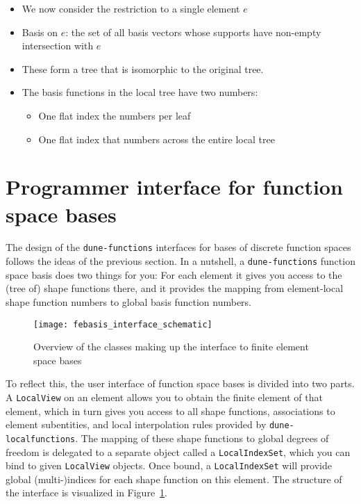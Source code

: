\documentclass[a4paper,10pt,headings=normal,bibliography=totoc]{scrartcl}
\newcommand{\cpp}[1]{\lstinline[basicstyle=\ttfamily]!#1!}
\newcommand{\dunemodule}[1]{\texttt{#1}}
\begin{document}
\begin{itemize}
 \item We now consider the restriction to a single element $e$
 \item Basis on $e$: the set of all basis vectors whose supports have non-empty
   intersection with $e$
 \item These form a tree that is isomorphic to the original tree.
 \item The basis functions in the local tree have two numbers:
   \begin{itemize}
    \item One flat index the numbers per leaf
    \item One flat index that numbers across the entire local tree
   \end{itemize}
\end{itemize}


\section{Programmer interface for function space bases}
\label{sec:dune_functions:function_space_bases_implementation}

The design of the \dunemodule{dune-functions} interfaces for bases of discrete function spaces
follows the ideas of the previous section.  In a nutshell, a \dunemodule{dune-functions} function space basis
does two things for you: For each element it gives you access to the (tree of) shape functions there,
and it provides the mapping from element-local shape function numbers to global basis function numbers.

\begin{figure}
 \begin{center}
  \texttt{[image: febasis\_interface\_schematic]}
 \end{center}
 \caption{Overview of the classes making up the interface to finite element space bases}
 \label{fig:dune_functions:febasis_interface_schematic}
\end{figure}


To reflect this, the user interface of function space bases is divided into two parts.  A \cpp{LocalView} on an
element allows you to obtain the finite element of that element, which in turn gives you access to all
shape functions, associations to element subentities, and local interpolation rules provided by
\dunemodule{dune-localfunctions}.  The mapping of these shape functions to global degrees of freedom is
delegated to a separate object called a \cpp{LocalIndexSet}, which you can bind to given
\cpp{LocalView} objects.  Once bound, a \cpp{LocalIndexSet} will provide global (multi-)indices
for each shape function on this element.  The structure of the interface is visualized in
Figure~\ref{fig:dune_functions:febasis_interface_schematic}.
\end{document}
